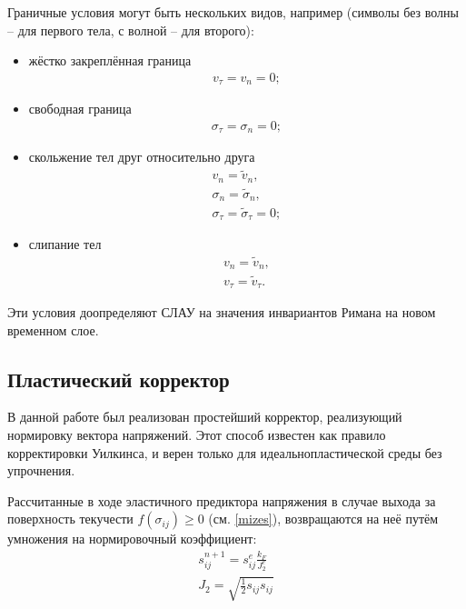 Граничные условия могут быть нескольких видов, например (символы без волны -- для первого тела, с волной -- для второго):
\begin{itemize}
\item{жёстко закреплённая граница
\begin{eqnarray}
v_\tau=v_n=0; \nonumber
\end{eqnarray}}
\item{свободная граница
\begin{eqnarray}
\sigma_\tau=\sigma_n=0; \nonumber
\end{eqnarray}}
\item{скольжение тел друг относительно друга 
\begin{eqnarray}
v_n=\tilde{v}_n,\nonumber\\
\sigma_n=\tilde{\sigma}_n,\nonumber\\
\sigma_\tau=\tilde{\sigma}_\tau=0; \nonumber
\end{eqnarray}}
\item{слипание тел
\begin{eqnarray}
v_n=\tilde{v}_n,\nonumber\\
v_\tau=\tilde{v}_\tau.
\end{eqnarray}}
\end{itemize}
Эти условия доопределяют СЛАУ на значения инвариантов Римана на новом временном слое.

\subsection{Пластический корректор}
В данной работе был реализован простейший корректор, реализующий нормировку вектора напряжений. Этот способ известен как правило корректировки Уилкинса\cite{wilkins}, и верен только для идеальнопластической среды без упрочнения.

Рассчитанные в ходе эластичного предиктора напряжения в случае выхода за поверхность текучести  $f(\sigma_{ij}) \geq 0$ (см. \ref{mizes}), возвращаются на неё путём умножения на нормировочный коэффициент:
\begin{eqnarray}
s_{ij}^{n+1} = s_{ij}^e\frac{k_F}{J_2^e}	\\
J_2 = \sqrt{\frac{1}{2}s_{ij}s_{ij}}
\end{eqnarray} 